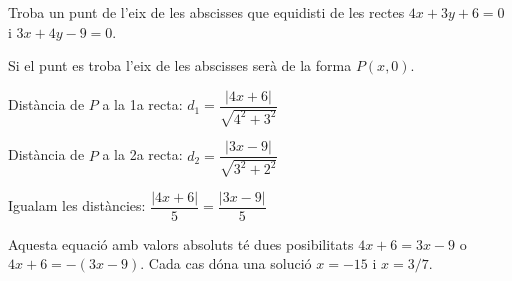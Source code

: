 \documentclass[11pt, a4paper, pdf]{article}
\begin{document}
\vspace{-0.65cm}
\begin{resolt}{Troba un punt de l'eix de les abscisses que equidisti de les rectes $4x+3y+6=0$ i $3x+4y-9=0$.}
	
	Si el punt es troba l'eix de les abscisses serà de la forma $P(x,0)$. \vspace{0.25cm}
	
	Distància de $P$ a la 1a recta: $d_1 = \dfrac{|4x+6|}{\sqrt{4^2+3^2}}$\vspace{0.25cm}
	
	Distància de $P$ a la 2a recta: $d_2 = \dfrac{|3x-9|}{\sqrt{3^2+2^2}}$\vspace{0.25cm}
	
	Igualam les distàncies: $\dfrac{|4x+6|}{5}=\dfrac{|3x-9|}{5}$ \vspace{0.25cm}
	
	Aquesta equació amb valors absoluts té dues posibilitats $4x+6=3x-9$ o $4x+6=-(3x-9)$. Cada cas dóna una solució $x=-15$ i $x=3/7$. 
\end{resolt}

\begin{comment}

\begin{mylist}
	\item   Calcula la distància del punt (1, 2) a les rectes que s'indiquen.
	\begin{tasks}(2)
		\task $x+3y=4$   \task $\left\{\begin{array}{l} {x=1-\lambda } \\ {y=2+2\lambda } \end{array}\right. $  \task $\dfrac{x-1}{2} =\dfrac{y-3}{-1} $  \task $y-2=4\left(x+1\right)$
	\end{tasks}
	
	\item  Troba la posició relativa de les rectes $r{\rm :}\frac{x}{-{\rm 1}} =\frac{y+{\rm 3}}{-{\rm 1}} $ i
	$s{\rm :}\left(x,y\right)=\left({\rm 1,}\; -{\rm 2}\right)+\lambda \left({\rm 1,}\; {\rm 1}\right)$
	així com l'angle que formen.
	
	
	\item  Tres punts d'un triangle són  A = (2, 1), \textit{B} = (2, 8) i \textit{C} = (4, $-$1). Calcular els seus costats i angles. 
	
	
\end{mylist}
\end{comment}

\vspace{-0.5cm}
\end{document}
